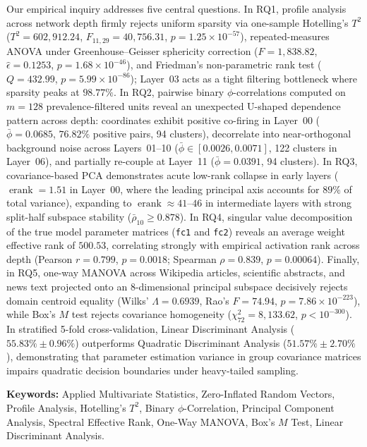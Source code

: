 \documentclass[12pt, a4paper, oneside]{report}
\theoremstyle{definition}
\newcommand{\erank}{\operatorname{erank}}
\begin{document}
Our empirical inquiry addresses five central questions. In RQ1, profile analysis across network depth firmly rejects uniform sparsity via one-sample Hotelling's $T^2$ ($T^2 = 602{,}912.24$, $F_{11,29} = 40{,}756.31$, $p = 1.25 \times 10^{-57}$), repeated-measures ANOVA under Greenhouse--Geisser sphericity correction ($F = 1{,}838.82$, $\hat{\epsilon} = 0.1253$, $p = 1.68 \times 10^{-46}$), and Friedman's non-parametric rank test ($Q = 432.99$, $p = 5.99 \times 10^{-86}$); Layer~03 acts as a tight filtering bottleneck where sparsity peaks at $98.77\%$. In RQ2, pairwise binary $\phi$-correlations computed on $m = 128$ prevalence-filtered units reveal an unexpected U-shaped dependence pattern across depth: coordinates exhibit positive co-firing in Layer~00 ($\bar{\phi} = 0.0685$, $76.82\%$ positive pairs, 94 clusters), decorrelate into near-orthogonal background noise across Layers~01--10 ($\bar{\phi} \in [0.0026, 0.0071]$, 122 clusters in Layer~06), and partially re-couple at Layer~11 ($\bar{\phi} = 0.0391$, 94 clusters). In RQ3, covariance-based PCA demonstrates acute low-rank collapse in early layers ($\erank = 1.51$ in Layer~00, where the leading principal axis accounts for $89\%$ of total variance), expanding to $\erank \approx 41\text{--}46$ in intermediate layers with strong split-half subspace stability ($\bar{\rho}_{10} \ge 0.878$). In RQ4, singular value decomposition of the true model parameter matrices (\texttt{fc1} and \texttt{fc2}) reveals an average weight effective rank of $500.53$, correlating strongly with empirical activation rank across depth (Pearson $r = 0.799$, $p = 0.0018$; Spearman $\rho = 0.839$, $p = 0.00064$). Finally, in RQ5, one-way MANOVA across Wikipedia articles, scientific abstracts, and news text projected onto an 8-dimensional principal subspace decisively rejects domain centroid equality (Wilks' $\Lambda = 0.6939$, Rao's $F = 74.94$, $p = 7.86 \times 10^{-223}$), while Box's $M$ test rejects covariance homogeneity ($\chi^2_{72} = 8{,}133.62$, $p < 10^{-300}$). In stratified 5-fold cross-validation, Linear Discriminant Analysis ($55.83\% \pm 0.96\%$) outperforms Quadratic Discriminant Analysis ($51.57\% \pm 2.70\%$), demonstrating that parameter estimation variance in group covariance matrices impairs quadratic decision boundaries under heavy-tailed sampling.

\vspace{0.5cm}
\noindent\textbf{Keywords:} Applied Multivariate Statistics, Zero-Inflated Random Vectors, Profile Analysis, Hotelling's $T^2$, Binary $\phi$-Correlation, Principal Component Analysis, Spectral Effective Rank, One-Way MANOVA, Box's $M$ Test, Linear Discriminant Analysis.
\end{document}
